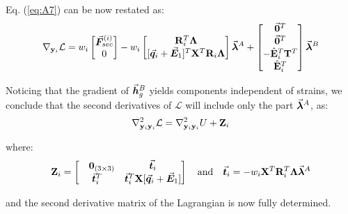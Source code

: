 \begin{appendices}
\noindent Eq. (\ref{eq:A7}) can be now restated as:
\begin{gather}
	\nabla_{\mathbf{y}_i}\mathcal{L} = w_i\begin{bmatrix}
		\bvec{F}_{sec}^{(i)} \\ 0
	\end{bmatrix} - w_i\begin{bmatrix}
		\bmat{R}_i^T\bmat{\Lambda} \\
		[\bvec{q}_i+\bvec{E}_1]^T\bmat{X}^T\bmat{R}_i\bmat{\Lambda}
	\end{bmatrix}\bvec{\lambda}^A + \begin{bmatrix}
		\bvec{0}^T \\ \bvec{0}^T \\ -\hat{\mathbf{E}}_i^T\bmat{T}^T \\ 
		\hat{\mathbf{E}}_i^T
	\end{bmatrix}\bvec{\lambda}^B
	\label{eq:this}
\end{gather}

\noindent Noticing that the gradient of $\vec{\boldsymbol{h}}_g^B$ yields components 
independent of
strains, we conclude that the second derivatives of $\mathcal{L}$ will include
only the part $\vec{\boldsymbol{\lambda}}^A$, as:
\begin{gather}
	\nabla^2_{\mathbf{y}_i\mathbf{y}_i}\mathcal{L} =
	\nabla^2_{\mathbf{y}_i\mathbf{y}_i}U
	+ \mathbf{Z}_i
	\label{eq:second}
\end{gather}

\noindent where:
\begin{gather}
	\mathbf{Z}_i = \begin{bmatrix}
		\ \ \ \mathbf{0}_{(3\times 3)} & \vec{\boldsymbol{t}}_i\\ \vec{\boldsymbol{t}}_i^T &
		\vec{\boldsymbol{t}}_i^T\mathbf{X}[\vec{\boldsymbol{q}}_i+\vec{\boldsymbol{E}}_1]
	\end{bmatrix}\quad\text{and}\quad \vec{\boldsymbol{t}}_i =
	-w_i\mathbf{X}^T\mathbf{R}_i^T\mathbf{\Lambda}\vec{\boldsymbol{\lambda}}^A\nonumber
\end{gather}

\noindent and the second derivative matrix of the Lagrangian is now fully
determined.

\chapter{}\label{appendix:APPENDIX_C}


\end{appendices}
